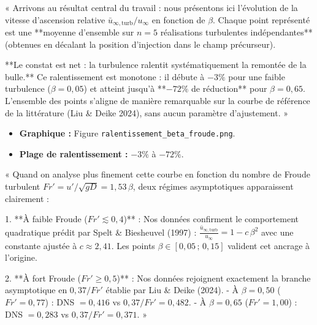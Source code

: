 \documentclass[11pt,a4paper]{article}
\begin{document}
\begin{tcolorbox}[slidebox,title=Diapositive 4 : Résultat Central — Évolution de la Vitesse Relative]
\begin{tcolorbox}[keybox,title=Ce qu'il faut dire à l'oral :]
« Arrivons au résultat central du travail : nous présentons ici l'évolution de la vitesse d'ascension relative $\bar{u}_{\infty,\text{turb}}/u_\infty$ en fonction de $\beta$. Chaque point représenté est une **moyenne d'ensemble sur $n=5$ réalisations turbulentes indépendantes** (obtenues en décalant la position d'injection dans le champ précurseur).

**Le constat est net : la turbulence ralentit systématiquement la remontée de la bulle.**  
Ce ralentissement est monotone : il débute à $-3\%$ pour une faible turbulence ($\beta = 0{,}05$) et atteint jusqu'à **$-72\%$ de réduction** pour $\beta = 0{,}65$.  
L'ensemble des points s'aligne de manière remarquable sur la courbe de référence de la littérature (Liu \& Deike 2024), sans aucun paramètre d'ajustement. »
\end{tcolorbox}

\begin{itemize}
    \item \textbf{Graphique :} Figure \texttt{ralentissement\_beta\_froude.png}.
    \item \textbf{Plage de ralentissement :} $-3\%$ à $-72\%$.
\end{itemize}
\end{tcolorbox}

\begin{tcolorbox}[slidebox,title=Diapositive 5 : Confrontation aux Deux Régimes de la Littérature]
\begin{tcolorbox}[keybox,title=Ce qu'il faut dire à l'oral :]
« Quand on analyse plus finement cette courbe en fonction du nombre de Froude turbulent $Fr' = u'/\sqrt{gD} = 1{,}53\,\beta$, deux régimes asymptotiques apparaissent clairement :

1. **À faible Froude ($Fr' \lesssim 0{,}4$)** : Nos données confirment le comportement quadratique prédit par Spelt \& Biesheuvel (1997) : $\frac{\bar{u}_{\infty,\text{turb}}}{u_\infty} = 1 - c\,\beta^2$ avec une constante ajustée à $c \approx 2{,}41$. Les points $\beta \in [0{,}05 \,;\, 0{,}15]$ valident cet ancrage à l'origine.

2. **À fort Froude ($Fr' \ge 0{,}5$)** : Nos données rejoignent exactement la branche asymptotique en $0{,}37/Fr'$ établie par Liu \& Deike (2024).  
   - À $\beta=0{,}50$ ($Fr'=0{,}77$) : DNS $= 0{,}416$ vs $0{,}37/Fr' = 0{,}482$.  
   - À $\beta=0{,}65$ ($Fr'=1{,}00$) : DNS $= 0{,}283$ vs $0{,}37/Fr' = 0{,}371$. »
\end{tcolorbox}
\end{tcolorbox}
\end{document}
